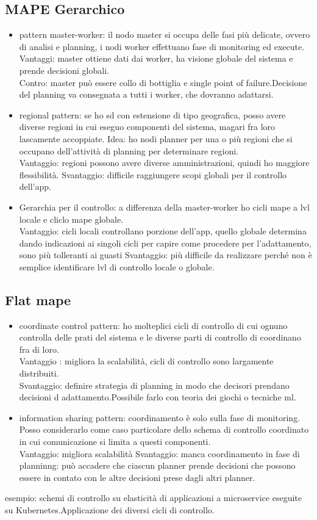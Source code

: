 \documentclass{article}
\begin{document}
\subsection{MAPE Gerarchico}
\begin{itemize}
\item pattern master-worker: 
il nodo master si occupa delle fasi più delicate, ovvero di analisi e planning, i nodi worker effettuano fase di monitoring ed execute.
Vantaggi: master ottiene dati dai worker, ha visione globale del sistema e prende decisioni globali.\\
Contro: master può essere collo di bottiglia e single point of failure.Decisione del planning va consegnata a tutti i worker, che dovranno adattarsi.
\item regional pattern: se ho sd con estensione di tipo geografica, posso avere diverse regioni in cui eseguo componenti del sistema, magari fra loro lascamente accoppiate. Idea: ho nodi planner per una o più regioni che si occupano dell'attività di planning per determinare regioni.\\
Vantaggio: regioni possono avere diverse amministrazioni, quindi ho maggiore flessibilità.
Svantaggio: difficile raggiungere scopi globali per il controllo dell'app.
\item Gerarchia per il controllo: a differenza della master-worker ho cicli mape a lvl locale e cliclo mape globale.\\
Vantaggio: cicli locali controllano porzione dell'app, quello globale determina dando indicazioni ai singoli cicli per capire come procedere per l'adattamento, sono più tolleranti ai guasti
Svantaggio: più difficile da realizzare perché non è semplice identificare lvl di controllo locale o globale.
\end{itemize}
\subsection{Flat mape}
\begin{itemize}
\item coordinate control pattern: ho molteplici cicli di controllo di cui ognuno controlla delle prati del sistema e le diverse parti di controllo di coordinano fra di loro.\\ Vantaggio : migliora la scalabilità, cicli di controllo sono largamente distribuiti.\\
Svantaggio: definire strategia di planning in modo che decisori prendano decisioni d adattamento.Possibile farlo con teoria dei giochi o tecniche ml.
\item information sharing pattern: coordinamento è solo sulla fase di monitoring. Posso considerarlo come caso particolare dello schema di controllo coordinato in cui comunicazione si limita a questi componenti.\\
Vantaggio: migliora scalabilità 
Svantaggio: manca coordinamento in fase di planninng: può accadere che ciascun planner prende decisioni che possono essere in contato con le altre decisioni prese dagli altri planner.
\end{itemize}
esempio: schemi di controllo su elasticità di applicazioni a microservice eseguite su Kubernetes.Applicazione dei diversi cicli di controllo.
\end{document}
